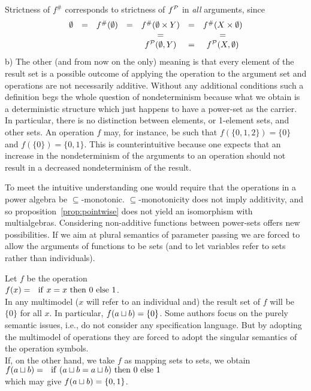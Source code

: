 Strictness of $f^{\#}$
corresponds to strictness of $f^{\cal P}$ in {\em all} arguments, since
\[ \begin{array}{ccccccc}
\emptyset & = & f^{\#}(\emptyset) & =& f^{\#}(\emptyset\times Y) & =& f^{\#}(X\times \emptyset) \\
    &   &             &  &   =                 &  &  = \\
 &  &             &  & f^{{\cal P}}(\emptyset,Y)    & =& f^{{\cal P}}(X,\emptyset)
\end{array} 
\] 
b) The other (and from now on the only) meaning is that every element
of the result set is a possible outcome of applying the operation to
the argument set and operations are not necessarily additive.  
Without any additional conditions such a
definition begs the whole question of nondeterminism because what we
obtain is a deterministic structure which just happens to have a
power-set as the carrier. In particular, there is no distinction
between elements, or 1-element sets, and other sets. An operation $f$
may, for instance, be such that $f(\{0,1,2\}) = \{0\}$ and $f(\{0\}) =
\{0,1\}$.  This is counterintuitive \cite{c:3a, c:103} because one expects that
an increase in the nondeterminism of the arguments to an operation
should not result in a decreased nondeterminism of the result.

To meet the intuitive 
understanding one would require that the operations in a power 
algebra be $\subseteq$-monotonic. $\subseteq$-monotonicity does 
not imply additivity, and so proposition~\ref{prop:pointwise} does 
not yield an isomorphism with multialgebras. Considering
non-additive functions between power-sets offers new possibilities. 
If we aim at plural semantics of parameter passing \cite{c:110, c:130} we are 
forced to allow the arguments of 
functions to be sets (and to let variables refer to sets rather than 
individuals). 

\begin{Example} 
Let $f$ be the operation \\[1ex]
\hspace*{2ex}
$f(x) = {\ \ \rm if\ }x=x{\rm\ then\ }0{\rm\ else\ }1$. \\[1ex]
In any multimodel ($x$ will 
refer to an individual and) the result set of $f$ will be $\{0\}$
for all $x$. In particular, 
$f(a\sqcup b)=\{0\}$. Some authors \cite{c:77, c:53} focus on the purely semantic issues, i.e., do 
not consider any specification language. But by adopting the 
multimodel of operations they are forced to adopt the singular 
semantics of the operation symbols. \\
If, on the other hand, we take 
$f$ as mapping sets to sets, we obtain \\[1ex]
\hspace*{2ex}
$f(a\ch b) = {\ \ \rm if\ }(a\ch b = a\ch b){\rm\ then\ }0{\rm\ else\ 
}1$\\[1ex]
which may give $f(a\sqcup b)=\{0,1\}$.
\end{Example}

